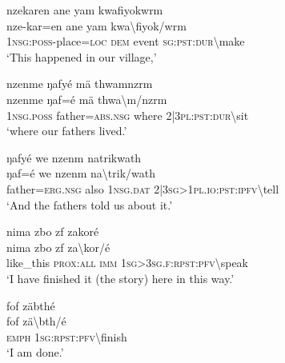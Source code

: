\ea\label{ex:7:a4890}
nzekaren ane yam kwafiyokwrm\\
\gll nze-kar=en	ane	yam	kwa{\textbackslash}fiyok/wrm\\
     1\textsc{nsg}:\textsc{poss}-place=\textsc{loc}	\textsc{dem}	event	\textsc{sg}:\textsc{pst}:\textsc{dur}{\textbackslash}make\\
\glt `This happened in our village,'
\z

\ea\label{ex:7:a4891}
nzenme ŋafyé mä thwamnzrm\\
\gll nzenme	ŋaf=é	mä	thwa{\textbackslash}m/nzrm\\
     1\textsc{nsg}.\textsc{poss}	father=\textsc{abs}.\textsc{nsg}	where	2|3\textsc{pl}:\textsc{pst}:\textsc{dur}{\textbackslash}sit\\
\glt `where our fathers lived.'
\z

\ea\label{ex:7:a4892}
ŋafyé we nzenm natrikwath\\
\gll ŋaf=é	we	nzenm	na{\textbackslash}trik/wath\\
     father=\textsc{erg}.\textsc{nsg}	also	1\textsc{nsg}.\textsc{dat}	2|3\textsc{sg}>1\textsc{pl}.\textsc{io}:\textsc{pst}:\textsc{ipfv}{\textbackslash}tell\\
\glt `And the fathers told us about it.'
\z

\ea\label{ex:7:a4893}
nima zbo zf zakoré\\
\gll nima	zbo	zf	za{\textbackslash}kor/é\\
     like\_this	\textsc{prox}:\textsc{all}	\textsc{imm}	1\textsc{sg}>3\textsc{sg}.\textsc{f}:\textsc{rpst}:\textsc{pfv}{\textbackslash}speak\\
\glt `I have finished it (the story) here in this way.'
\z

\ea\label{ex:7:a4894}
fof zäbthé\\
\gll fof	zä{\textbackslash}bth/é\\
     \textsc{emph}	1\textsc{sg}:\textsc{rpst}:\textsc{pfv}{\textbackslash}finish\\
\glt `I am done.'
\z
